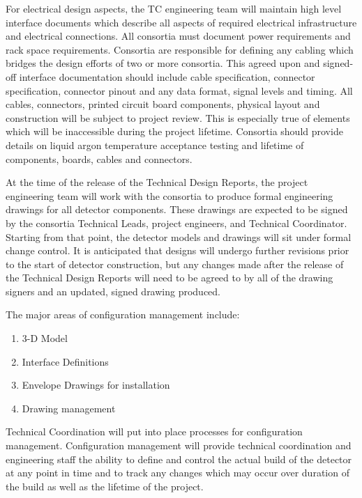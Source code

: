 For electrical design aspects, the TC
engineering team will maintain high level interface documents which
describe all aspects of required electrical infrastructure and
electrical connections.  All consortia must document power
requirements and rack space requirements.  Consortia are responsible
for defining any cabling which bridges the design efforts of two or
more consortia.  This agreed upon and signed-off interface
documentation should include cable specification, connector
specification, connector pinout and any data format, signal levels and
timing.  All cables, connectors, printed circuit board components,
physical layout and construction will be subject to project review.
This is especially true of elements which will be inaccessible during
the project lifetime.  Consortia should provide details on liquid
argon temperature acceptance testing and lifetime of components,
boards, cables and connectors.


At the time of the release of the Technical Design Reports, the
project engineering team will work with the consortia to produce
formal engineering drawings for all detector components.  These
drawings are expected to be signed by the consortia Technical Leads,
project engineers, and Technical Coordinator.  Starting from that
point, the detector models and drawings will sit under formal change
control.  It is anticipated that designs will undergo further
revisions prior to the start of detector construction, but any changes
made after the release of the Technical Design Reports will need to be
agreed to by all of the drawing signers and an updated, signed drawing
produced.

The major areas of configuration management include:
\begin{enumerate}
  \item 3-D Model
  \item Interface Definitions
  \item Envelope Drawings for installation
  \item Drawing management
\end{enumerate}

\label{ssec:fdsp-coord-integ-cnfg-mgmt}

Technical Coordination will put into place processes for
configuration management.  Configuration management will provide
technical coordination and engineering staff the ability to define and
control the actual build of the detector at any point in time and to
track any changes which may occur over duration of the build as well
as the lifetime of the project.

